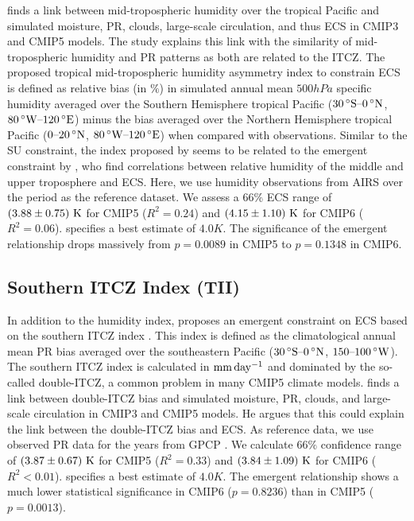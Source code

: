 \textcite{Tian2015} finds a link between mid-tropospheric humidity over the
tropical Pacific and simulated moisture, \acl{PR}, clouds, large-scale
circulation, and thus \ac{ECS} in \acs{CMIP}3 and \acs{CMIP}5 models. The study
explains this link with the similarity of mid-tropospheric humidity and
\acl{PR} patterns as both are related to the \ac{ITCZ}. The proposed tropical
mid-tropospheric humidity asymmetry index to constrain \ac{ECS} is defined as
relative bias (in $\si{\%}$) in simulated annual mean $500 \unit{hPa}$ specific
humidity averaged over the Southern Hemisphere tropical Pacific ($\range{30
  \unit{\degree S}}{0 \unit{\degree N}}$, $\range{80 \unit{\degree W}}{120
  \unit{\degree E}}$) minus the bias averaged over the Northern Hemisphere
tropical Pacific ($\rangeunit{0}{20}{\degree N}$, $\range{80 \unit{\degree
    W}}{120 \unit{\degree E}}$) when compared with observations. Similar to
the SU constraint, the index proposed by \textcite{Tian2015} seems to be
related to the emergent constraint by \textcite{Fasullo2012}, who find
correlations between relative humidity of the middle and upper troposphere and
\ac{ECS}. Here, we use humidity observations from AIRS \autocite{Aumann2003}
over the period  as the reference dataset. We assess a $66
\unit{\%}$ \ac{ECS} range of $\pmrangeunit{3.88}{0.75}{K}$ for \acs{CMIP}5
($R^2 = 0.24$) and $\pmrangeunit{4.15}{1.10}{K}$ for \acs{CMIP}6 ($R^2 =
0.06$). \Textcite{Tian2015} specifies a best estimate of $4.0 \unit{K}$. The
significance of the emergent relationship drops massively from $p = 0.0089$ in
\acs{CMIP}5 to $p = 0.1348$ in \acs{CMIP}6.


\subsection{Southern \acs{ITCZ} Index (TII)}
\label{subsec:05:tii}

In addition to the humidity index, \textcite{Tian2015} proposes an emergent
constraint on \ac{ECS} based on the southern \ac{ITCZ} index
\autocite{Bellucci2010, Hirota2011}. This index is defined as the
climatological annual mean \acl{PR} bias averaged over the southeastern Pacific
($\range{30 \unit{\degree S}}{0 \unit{\degree N}}$,
$\rangeunit{150}{100}{\degree W}$). The southern \ac{ITCZ} index is calculated
in $\si{\mmday{}}$ and dominated by the so-called double-\ac{ITCZ}, a common
problem in many \acs{CMIP}5 climate models. \Textcite{Tian2015} finds a link
between double-\ac{ITCZ} bias and simulated moisture, \acl{PR}, clouds, and
large-scale circulation in \acs{CMIP}3 and \acs{CMIP}5 models. He argues that
this could explain the link between the double-\acs{ITCZ} bias and \ac{ECS}. As
reference data, we use observed \acl{PR} data for the years 
from GPCP \autocite{Adler2003}. We calculate  $66 \unit{\%}$
confidence range of $\pmrangeunit{3.87}{0.67}{K}$ for \acs{CMIP}5 ($R^2 =
0.33$) and $\pmrangeunit{3.84}{1.09}{K}$ for \acs{CMIP}6 ($R^2 < 0.01$).
\Textcite{Tian2015} specifies a best estimate of $4.0 \unit{K}$. The emergent
relationship shows a much lower statistical significance in \acs{CMIP}6 ($p =
0.8236$) than in \acs{CMIP}5 ($p = 0.0013$).


